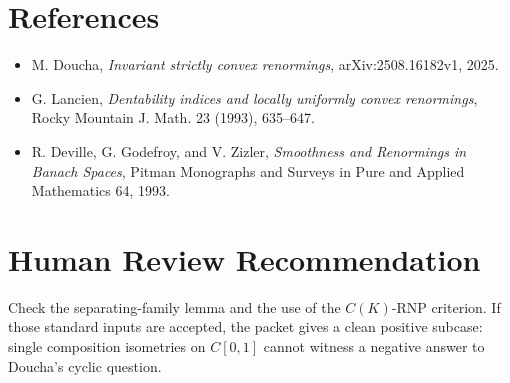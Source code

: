 \documentclass[11pt]{article}
\begin{document}
\section*{References}

\begin{itemize}
\item M. Doucha, \emph{Invariant strictly convex renormings},
arXiv:2508.16182v1, 2025.
\item G. Lancien, \emph{Dentability indices and locally uniformly convex
renormings}, Rocky Mountain J. Math. 23 (1993), 635--647.
\item R. Deville, G. Godefroy, and V. Zizler, \emph{Smoothness and Renormings
in Banach Spaces}, Pitman Monographs and Surveys in Pure and Applied
Mathematics 64, 1993.
\end{itemize}

\section*{Human Review Recommendation}

Check the separating-family lemma and the use of the \(C(K)\)-RNP criterion.
If those standard inputs are accepted, the packet gives a clean positive
subcase: single composition isometries on \(C[0,1]\) cannot witness a negative
answer to Doucha's cyclic question.
\end{document}
